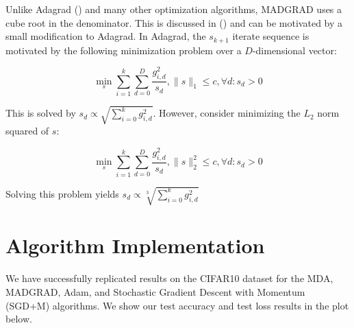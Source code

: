 \documentclass{article}
\begin{document}
Unlike Adagrad (\cite{duchi_adaptive_nodate}) and many other optimization algorithms, MADGRAD uses a cube root in the
denominator. This is discussed in (\cite{defazio_adaptivity_nodate}) and can be motivated by a small modification to
Adagrad. In Adagrad, the $s_{k+1}$ iterate sequence is motivated by the following minimization problem over a
$D$-dimensional vector:

\[
  \min_{s} \sum\limits_{i=1}^k\sum\limits_{d=0}^D \frac{g_{i,d}^2}{s_{d}}, \|s\|_1 \leq c, \forall d: s_d > 0
\]

This is solved by $s_d \propto \sqrt{\sum_{i=0}^k g_{i,d}^2}$. However, consider minimizing the $L_2$ norm squared of
$s$:

\[
  \min_{s} \sum\limits_{i=1}^k\sum\limits_{d=0}^D \frac{g_{i,d}^2}{s_{d}}, \|s\|_{2}^2 \leq c, \forall d: s_d > 0
\]

Solving this problem yields $s_d \propto \sqrt[3]{\sum_{i=0}^k g_{i,d}^2}$

\section{Algorithm Implementation}

We have successfully replicated results on the CIFAR10 dataset for the MDA, MADGRAD, Adam, and Stochastic
Gradient Descent with Momentum (SGD+M) algorithms. We show our test accuracy and test loss results in the plot below.
\end{document}
